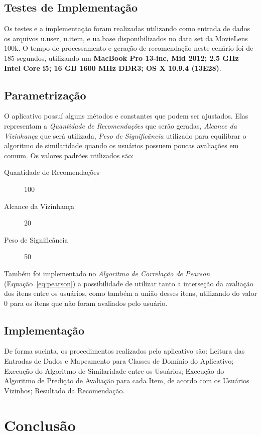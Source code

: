 \documentclass[12pt]{article}
\begin{document}
\subsection{Testes de Implementação}

Os testes e a implementação foram realizadas utilizando como entrada de dados os arquivos u.user, u.item, e ua.base disponibilizados no data set da MovieLens 100k\cite{movielens100k}. O tempo de processamento e geração de recomendação neste cenário foi de 185 segundos, utilizando um \textbf{MacBook Pro 13-inc, Mid 2012; 2,5 GHz Intel Core i5; 16 GB 1600 MHz DDR3; OS X 10.9.4 (13E28)}.

\subsection{Parametrização}

O aplicativo possuí alguns métodos e constantes que podem ser ajustados. Elas representam a \textit{Quantidade de Recomendações} que serão geradas, \textit{Alcance da Vizinhança} que será utilizada, \textit{Peso de Significância} utilizado para equilibrar o algoritmo de similaridade quando os usuários possuem poucas avaliações em comum. Os valores padrões utilizados são:

\begin{description}
\item[Quantidade de Recomendações] 100
\item[Alcance da Vizinhança] 20
\item[Peso de Significância] 50
\end{description}
Também foi implementado no \textit{Algoritmo de Correlação de Pearson} (Equação~\ref{eq:pearson}) a possibilidade de utilizar tanto a interseção da avaliação dos itens entre os usuários, como também a união desses itens, utilizando do valor 0 para os itens que não foram avaliados pelo usuário.

\subsection{Implementação}

De forma sucinta, os procedimentos realizados pelo aplicativo são: Leitura das Entradas de Dados e Mapeamento para Classes de Domínio do Aplicativo; Execução do Algoritmo de Similaridade entre os Usuários; Execução do Algoritmo de Predição de Avaliação para cada Item, de acordo com os Usuários Vizinhos; Resultado da Recomendação.

\section{Conclusão} \label{sec:conclusao}
\end{document}
